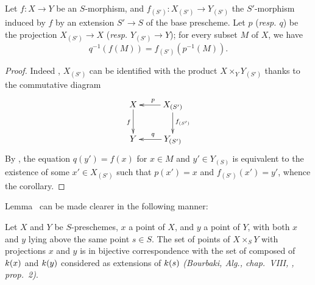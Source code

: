 \begin{corollary}[3.4.8]
\label{1.3.4.8}
Let $f:X\to Y$ be an $S$-morphism, and $f_{(S')}:X_{(S')}\to Y_{(S')}$ the $S'$-morphism induced by $f$ by an extension $S'\to S$ of the base prescheme.
Let $p$ (\emph{resp. $q$}) be the projection $X_{(S')}\to X$ (\emph{resp. $Y_{(S')}\to Y$}); for every subset $M$ of $X$, we have
\[
  q^{-1}(f(M))=f_{(S')}(p^{-1}(M)).
\]
\end{corollary}

\begin{proof}
\label{proof-1.3.4.8}
Indeed , $X_{(S')}$ can be identified with the product $X\times_Y Y_{(S')}$ thanks to the commutative diagram
\[
  \xymatrix{
    X\ar[d]_f &
    X_{(S')}\ar[l]_p\ar[d]^{f_{(S')}}\\
    Y &
    Y_{(S')}\ar[l]_q
  }
\]
By , the equation $q(y')=f(x)$ for $x\in M$ and $y'\in Y_{(S)}$ is equivalent to the existence of some $x'\in X_{(S')}$ such that $p(x')=x$ and $f_{(S')}(x')=y'$, whence the corollary.
\end{proof}

Lemma~ can be made clearer in the following manner:
\begin{proposition}[3.4.9]
\label{1.3.4.9}
Let $X$ and $Y$ be $S$-preschemes, $x$ a point of $X$, and $y$ a point of $Y$, with both $x$ and $y$ lying above the same point $s\in S$.
The set of points of $X\times_S Y$ with projections $x$ and $y$ is in bijective correspondence with the set of  composed of $k(x)$ and $k(y)$ considered as extensions of $k(s)$ \emph{(Bourbaki, \emph{Alg.}, chap.~VIII, , prop.~2)}.
\end{proposition}


